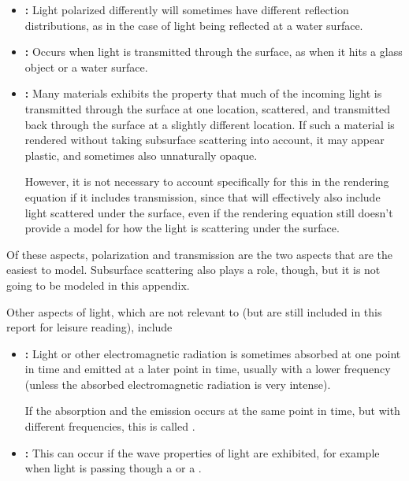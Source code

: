 {\begin{itemize}
\item \textbf{:} Light polarized differently will sometimes have different reflection distributions, as in the case of light being reflected at a water surface.

\item \textbf{:} Occurs when light is transmitted through the surface, as when it hits a glass object or a water surface.

\item \textbf{:} Many materials exhibits the property that much of the incoming light is transmitted through the surface at one location, scattered, and transmitted back through the surface at a slightly different location. If such a material is rendered without taking subsurface scattering into account, it may appear plastic, and sometimes also unnaturally opaque.

However, it is not necessary to account specifically for this in the rendering equation if it includes transmission, since that will effectively also include light scattered under the surface, even if the rendering equation still doesn't provide a model for how the light is scattering under the surface.
\end{itemize}

Of these aspects, polarization and transmission are the two aspects that are the easiest to model. Subsurface scattering also plays a role, though, but it is not going to be modeled in this appendix.

Other aspects of light, which are not relevant to \surfacewaterrendering (but are still included in this report for leisure reading), include

\begin{itemize}
\item \textbf{:} Light or other electromagnetic radiation is sometimes absorbed at one point in time and emitted at a later point in time, usually with a lower frequency (unless the absorbed electromagnetic radiation is very intense).

If the absorption and the emission occurs at the same point in time, but with different frequencies, this is called .
    
\item \textbf{:} This can occur if the wave properties of light are exhibited, for example when light is passing though a  or a .
    

\end{itemize}}
